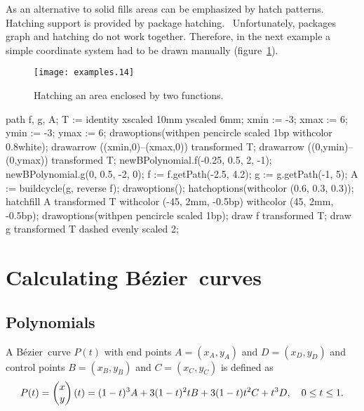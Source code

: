 \documentclass{article}
\newcommand*{\name}[1]{\textsf{#1}}
\newcommand*{\B}{B\'ezier}
\begin{document}
As an alternative to solid fills areas can be emphasized by hatch patterns.  Hatching support is provided by package \name{hatching}.~\cite{mp:hatching}  Unfortunately, packages \name{graph} and \name{hatching} do not work together.  Therefore, in the next example a simple coordinate system had to be drawn manually (figure~\ref{fig:hatching.mp}).

\begin{figure}
  \centering
  \texttt{[image: examples.14]}
  \caption{Hatching an area enclosed by two functions.}
  \label{fig:hatching.mp}
\end{figure}

\begin{listing}
path f, g, A;
  T := identity xscaled 10mm yscaled 6mm;
  xmin := -3; xmax := 6;
  ymin := -3; ymax := 6;
  drawoptions(withpen pencircle scaled 1bp withcolor 0.8white);
  drawarrow ((xmin,0)--(xmax,0)) transformed T;
  drawarrow ((0,ymin)--(0,ymax)) transformed T;
  newBPolynomial.f(-0.25, 0.5, 2, -1);
  newBPolynomial.g(0, 0.5, -2, 0);
  f := f.getPath(-2.5, 4.2);
  g := g.getPath(-1, 5);
  A := buildcycle(g, reverse f);
  drawoptions();
  hatchoptions(withcolor (0.6, 0.3, 0.3));
  hatchfill A transformed T
    withcolor (-45, 2mm, -0.5bp) withcolor (45, 2mm, -0.5bp);
  drawoptions(withpen pencircle scaled 1bp);
  draw f transformed T;
  draw g transformed T dashed evenly scaled 2;
\end{listing}


\appendix
\section{Calculating \B\ curves}\label{app:mathematics}
\subsection{Polynomials}\label{app:polynomials}
%
A \B\ curve $P(t)$ with end points $A=(x_A,y_A)$ and $D=(x_D,y_D)$ and control points $B=(x_B,y_B)$ and $C=(x_C,y_C)$ is defined as~\cite{mfbook}
\begin{equation}
P(t) = \left(
  \begin{array}{@{}c@{}}
    x\\
    y\\
  \end{array}
  \right)(t) = (1-t)^3A + 3(1-t)^2tB + 3(1-t)t^2C + t^3D,\quad 0\leq t\leq 1.
\end{equation}
\end{document}
